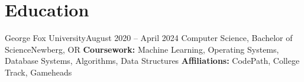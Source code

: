 \section{Education}
  \resumeSubHeadingListStart
    \resumeEducationSubheading
        {George Fox University}{August 2020 -- April 2024}
        {Computer Science, Bachelor of Science}{Newberg, OR}
        {\textbf{Coursework:} Machine Learning, Operating Systems, Database Systems, Algorithms, Data Structures}
        {\textbf{Affiliations:} CodePath, College Track, Gameheads}
  \resumeSubHeadingListEnd


